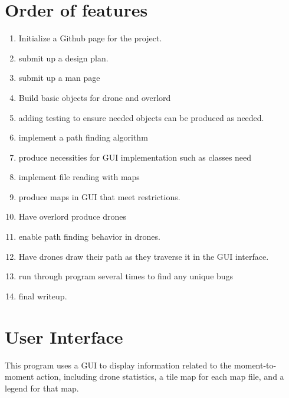 \documentclass[12pt]{article}
\begin{document}
\section{Order of features}
\begin{enumerate}
  \item Initialize a Github page for the project.
  \item submit up a design plan.
  \item submit up a man page
  \item Build basic objects for drone and overlord
  \item adding testing to ensure needed objects can be produced as needed.
  \item implement a path finding algorithm
  \item produce necessities for GUI implementation such as classes need
  \item implement file reading with maps
  \item produce maps in GUI that meet restrictions.
  \item Have overlord produce drones
  \item enable path finding behavior in drones.
  \item Have drones draw their path as they traverse it in the GUI interface.
  \item run through program several times to find any unique bugs
  \item final writeup.
\end{enumerate}
\section{User Interface}
This program uses a GUI to display information related to the moment-to-moment action, including drone statistics, a tile map for each map file, and a legend for that map.
\end{document}
